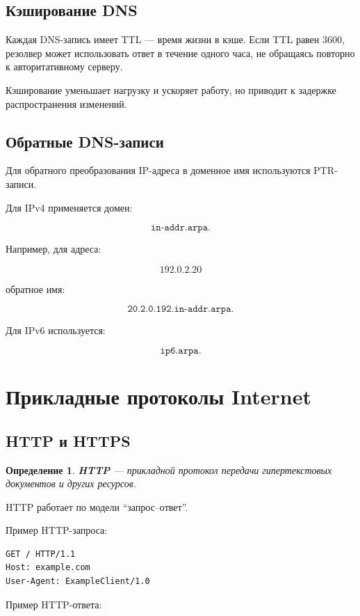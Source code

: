 \documentclass[12pt,a4paper]{article}
\newtheorem{definition}{Определение}
\begin{document}
\subsection{Кэширование DNS}

Каждая DNS-запись имеет TTL --- время жизни в кэше. Если TTL равен 3600, резолвер может использовать ответ в течение одного часа, не обращаясь повторно к авторитативному серверу.

Кэширование уменьшает нагрузку и ускоряет работу, но приводит к задержке распространения изменений.

\subsection{Обратные DNS-записи}

Для обратного преобразования IP-адреса в доменное имя используются PTR-записи.

Для IPv4 применяется домен:

\[
\texttt{in-addr.arpa}.
\]

Например, для адреса:

\[
192.0.2.20
\]

обратное имя:

\[
\texttt{20.2.0.192.in-addr.arpa}.
\]

Для IPv6 используется:

\[
\texttt{ip6.arpa}.
\]

\section{Прикладные протоколы Internet}

\subsection{HTTP и HTTPS}

\begin{definition}
\textbf{HTTP} --- прикладной протокол передачи гипертекстовых документов и других ресурсов.
\end{definition}

HTTP работает по модели ``запрос--ответ''.

Пример HTTP-запроса:

\begin{lstlisting}
GET / HTTP/1.1
Host: example.com
User-Agent: ExampleClient/1.0
\end{lstlisting}

Пример HTTP-ответа:
\end{document}
